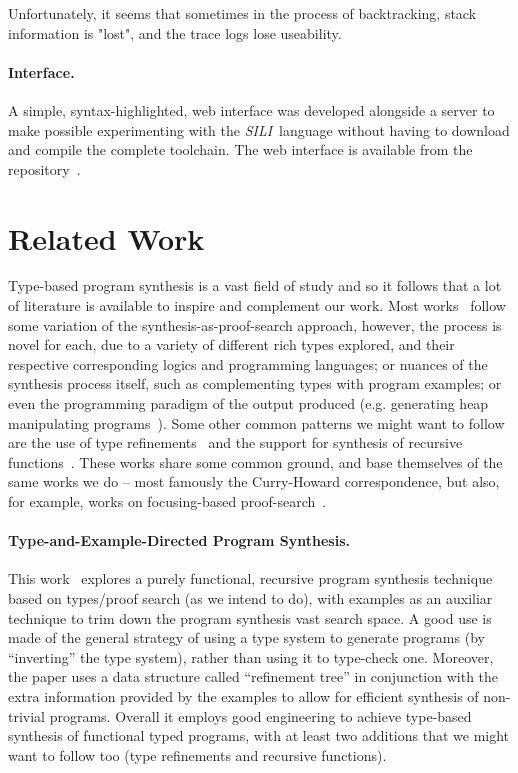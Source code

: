 \documentclass{llncs}
\newcommand{\mypara}[1]{\paragraph{\textbf{#1}.}}
\newcommand{\synname}{\emph{SILI}}
\begin{document}
Unfortunately, it seems that sometimes in the process of backtracking, stack
information is "lost", and the trace logs lose useability.

\mypara{Interface} A simple, syntax-highlighted, web interface was developed
alongside a server to make possible experimenting with the \synname\ 
language without having to download and compile the complete toolchain. The web
interface is available from the repository~\cite{github repo}.





\section{Related Work}

Type-based program synthesis is a vast field of study and so it
follows that a lot of literature is available to inspire and
complement our work. Most works~\cite{DBLP:conf/lopstr/HughesO20,DBLP:conf/pldi/PolikarpovaKS16,DBLP:conf/pldi/OseraZ15,DBLP:conf/popl/FrankleOWZ16} follow some variation of the
synthesis-as-proof-search approach, however, the process is novel for
each, due to a variety of different rich types explored, and their
respective corresponding logics and programming languages; or nuances
of the synthesis process itself, such as complementing types with
program examples; or even the programming paradigm of the output
produced (e.g. generating heap manipulating
programs~\cite{DBLP:journals/pacmpl/PolikarpovaS19}).  Some other
common patterns we might want to follow are the use of type
refinements~\cite{DBLP:conf/pldi/PolikarpovaKS16} and the support for synthesis of recursive
functions~\cite{DBLP:conf/pldi/PolikarpovaKS16,DBLP:conf/pldi/OseraZ15}.  These works share some common ground, and base
themselves of the same works we do -- most famously the Curry-Howard
correspondence, but also, for example, works on focusing-based
proof-search~\cite{10.1093/logcom/2.3.297}.

\mypara{Type-and-Example-Directed Program Synthesis} This
work~\cite{DBLP:conf/pldi/OseraZ15,DBLP:conf/popl/FrankleOWZ16}
explores a purely functional, recursive program synthesis technique
based on types/proof search (as we intend to do), with examples as an
auxiliar technique to trim down the program synthesis vast search
space. A good use is
made of the general strategy of using a type system to generate
programs (by ``inverting'' the type system), rather than using it to
type-check one.  Moreover, the paper uses a data structure called
``refinement tree'' in conjunction with the extra information provided
by the examples to allow for efficient synthesis of non-trivial
programs. Overall it employs good engineering to achieve type-based
synthesis of functional typed programs, with at least two additions
that we might want to follow too (type refinements and recursive
functions).
\end{document}
